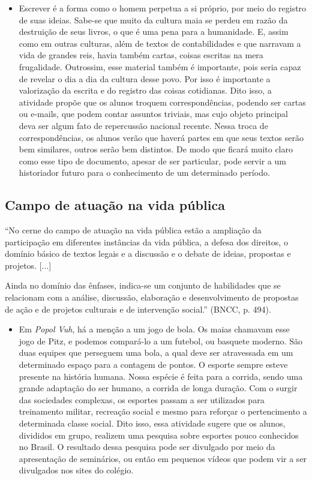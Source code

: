 \documentclass[12pt]{extarticle}
\begin{document}
\begin{itemize}
\item
  Escrever é a forma como o homem perpetua a si próprio, por meio do
  registro de suas ideias. Sabe-se que muito da cultura maia se perdeu
  em razão da destruição de seus livros, o que é uma pena para a
  humanidade. E, assim como em outras culturas, além de textos de
  contabilidades e que narravam a vida de grandes reis, havia também
  cartas, coisas escritas na mera frugalidade. Outrossim, esse material
  também é importante, pois seria capaz de revelar o dia a dia da
  cultura desse povo. Por isso é importante a valorização da escrita e
  do registro das coisas cotidianas. Dito isso, a atividade propõe que
  os alunos troquem correspondências, podendo ser cartas ou e-mails, que
  podem contar assuntos triviais, mas cujo objeto principal deva ser
  algum fato de repercussão nacional recente. Nessa troca de
  correspondências, os alunos verão que haverá partes em que seus textos
  serão bem similares, outros serão bem distintos. De modo que ficará
  muito claro como esse tipo de documento, apesar de ser particular,
  pode servir a um historiador futuro para o conhecimento de um
  determinado período.
\end{itemize}

\subsection{Campo de atuação na vida pública}

``No cerne do campo de atuação na vida pública estão a ampliação da
participação em diferentes instâncias da vida pública, a defesa dos
direitos, o domínio básico de textos legais e a discussão e o debate de
ideias, propostas e projetos. {[}...{]}

Ainda no domínio das ênfases, indica-se um conjunto de habilidades que
se relacionam com a análise, discussão, elaboração e desenvolvimento de
propostas de ação e de projetos culturais e de intervenção social.''
(BNCC, p. 494).

\begin{itemize}
\item
  Em \emph{Popol Vuh}, há a menção a um jogo de bola. Os maias chamavam
  esse jogo de Pitz, e podemos compará-lo a um futebol, ou basquete
  moderno. São duas equipes que perseguem uma bola, a qual deve ser
  atravessada em um determinado espaço para a contagem de pontos. O
  esporte sempre esteve presente na história humana. Nossa espécie é
  feita para a corrida, sendo uma grande adaptação do ser humano, a
  corrida de longa duração. Com o surgir das sociedades complexas, os
  esportes passam a ser utilizados para treinamento militar, recreação
  social e mesmo para reforçar o pertencimento a determinada classe
  social. Dito isso, essa atividade sugere que os alunos, divididos em
  grupo, realizem uma pesquisa sobre esportes pouco conhecidos no
  Brasil. O resultado dessa pesquisa pode ser divulgado por meio da
  apresentação de seminários, ou então em pequenos vídeos que podem vir
  a ser divulgados nos sites do colégio.
\end{itemize}
\end{document}
